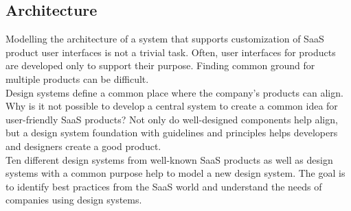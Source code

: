 \subsection{Architecture}
Modelling the architecture of a system that supports customization of SaaS product user interfaces is not a trivial task. Often, user interfaces for products are developed only to support their purpose. Finding common ground for multiple products can be difficult.  \\
Design systems define a common place where the company's products can align. Why is it not possible to develop a central system to create a common idea for user-friendly SaaS products? Not only do well-designed components help align, but a design system foundation with guidelines and principles helps developers and designers create a good product. \\
Ten different design systems from well-known SaaS products as well as design systems with a common purpose help to model a new design system. The goal is to identify best practices from the SaaS world and understand the needs of companies using design systems.

